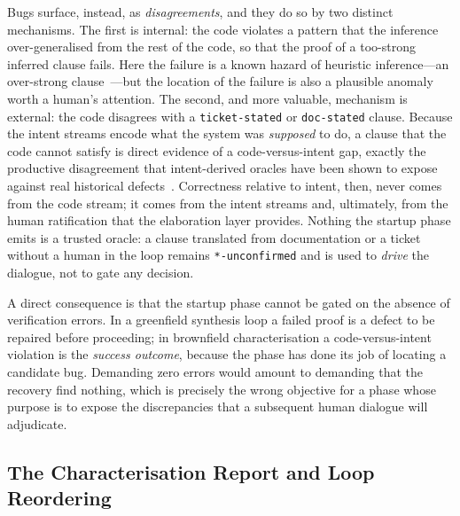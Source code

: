 Bugs surface, instead, as \emph{disagreements}, and they do so by two distinct mechanisms. The first is internal: the code violates a pattern that the inference over-generalised from the rest of the code, so that the proof of a too-strong inferred clause fails. Here the failure is a known hazard of heuristic inference---an over-strong clause~\cite{flanagan2001houdini}---but the location of the failure is also a plausible anomaly worth a human's attention. The second, and more valuable, mechanism is external: the code disagrees with a \texttt{ticket-stated} or \texttt{doc-stated} clause. Because the intent streams encode what the system was \emph{supposed} to do, a clause that the code cannot satisfy is direct evidence of a code-versus-intent gap, exactly the productive disagreement that intent-derived oracles have been shown to expose against real historical defects~\cite{endres2024nl2postcond}. Correctness relative to intent, then, never comes from the code stream; it comes from the intent streams and, ultimately, from the human ratification that the elaboration layer provides. Nothing the startup phase emits is a trusted oracle: a clause translated from documentation or a ticket without a human in the loop remains \texttt{*-unconfirmed} and is used to \emph{drive} the dialogue, not to gate any decision.

A direct consequence is that the startup phase cannot be gated on the absence of verification errors. In a greenfield synthesis loop a failed proof is a defect to be repaired before proceeding; in brownfield characterisation a code-versus-intent violation is the \emph{success outcome}, because the phase has done its job of locating a candidate bug. Demanding zero errors would amount to demanding that the recovery find nothing, which is precisely the wrong objective for a phase whose purpose is to expose the discrepancies that a subsequent human dialogue will adjudicate.

\subsection{The Characterisation Report and Loop Reordering}
\label{subsec:bf-report}

